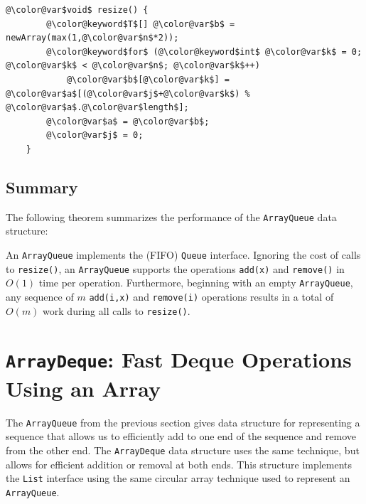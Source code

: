 \begin{Verbatim}[tabsize=2,frame=single,commandchars=\\@\$,label=\texttt{ArrayQueue},labelposition=topline]
	@\color@var$void$ resize() {
		@\color@keyword$T$[] @\color@var$b$ = newArray(max(1,@\color@var$n$*2));
		@\color@keyword$for$ (@\color@keyword$int$ @\color@var$k$ = 0; @\color@var$k$ < @\color@var$n$; @\color@var$k$++) 
			@\color@var$b$[@\color@var$k$] = @\color@var$a$[(@\color@var$j$+@\color@var$k$) % @\color@var$a$.@\color@var$length$];
		@\color@var$a$ = @\color@var$b$;
		@\color@var$j$ = 0;
	}
\end{Verbatim}

\subsection{Summary}

The following theorem summarizes the performance of the \mbox{\texttt{ArrayQueue}}
data structure:

\begin{thm}
An \mbox{\texttt{ArrayQueue}} implements the (FIFO) \mbox{\texttt{Queue}} interface.  Ignoring the cost of
calls to \mbox{\texttt{resize()}}, an \mbox{\texttt{ArrayQueue}} supports the operations
\mbox{\texttt{add({\color{var}x})}} and \mbox{\texttt{remove()}} in $O(1)$ time per operation.
Furthermore, beginning with an empty \mbox{\texttt{ArrayQueue}}, any sequence of $m$
\mbox{\texttt{add({\color{var}i},{\color{var}x})}} and \mbox{\texttt{remove({\color{var}i})}} operations results in a total of $O(m)$
work during all calls to \mbox{\texttt{resize()}}.
\end{thm}


\section{\mbox{\texttt{ArrayDeque}}: Fast Deque Operations Using an Array}

The \mbox{\texttt{ArrayQueue}} from the previous section gives data structure for
representing a sequence that allows us to efficiently add to one end
of the sequence and remove from the other end.  The \mbox{\texttt{ArrayDeque}} data
structure uses the same technique, but allows for efficient addition or
removal at both ends.  This structure implements the \mbox{\texttt{List}} interface
using the same circular array technique used to represent an \mbox{\texttt{ArrayQueue}}.

